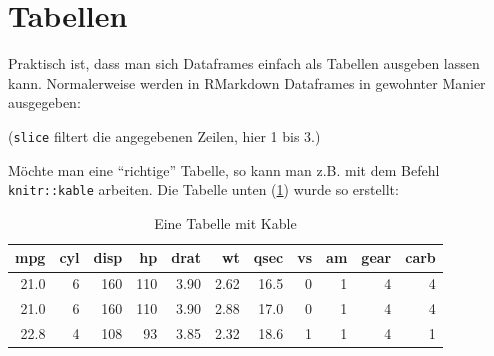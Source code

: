 \documentclass[12pt,]{book}
\newenvironment{Shaded}{\begin{snugshade}}{\end{snugshade}}
\newcommand{\KeywordTok}[1]{\textcolor[rgb]{0.13,0.29,0.53}{\textbf{{#1}}}}
\newcommand{\DataTypeTok}[1]{\textcolor[rgb]{0.13,0.29,0.53}{{#1}}}
\newcommand{\DecValTok}[1]{\textcolor[rgb]{0.00,0.00,0.81}{{#1}}}
\newcommand{\StringTok}[1]{\textcolor[rgb]{0.31,0.60,0.02}{{#1}}}
\newcommand{\CommentTok}[1]{\textcolor[rgb]{0.56,0.35,0.01}{\textit{{#1}}}}
\newcommand{\NormalTok}[1]{{#1}}
\begin{document}
\section{Tabellen}\label{tabellen}

Praktisch ist, dass man sich Dataframes einfach als Tabellen ausgeben
lassen kann. Normalerweise werden in RMarkdown Dataframes in gewohnter
Manier ausgegeben:

\begin{Shaded}
\end{Shaded}

(\texttt{slice} filtert die angegebenen Zeilen, hier 1 bis 3.)

Möchte man eine ``richtige'' Tabelle, so kann man z.B. mit dem Befehl
\texttt{knitr::kable} arbeiten. Die Tabelle unten (\ref{tab:kable})
wurde so erstellt:

\begin{Shaded}
\end{Shaded}

\begin{table}

\caption{\label{tab:kable}Eine Tabelle mit Kable}
\centering
\begin{tabular}[t]{r|r|r|r|r|r|r|r|r|r|r}
\hline
mpg & cyl & disp & hp & drat & wt & qsec & vs & am & gear & carb\\
\hline
21.0 & 6 & 160 & 110 & 3.90 & 2.62 & 16.5 & 0 & 1 & 4 & 4\\
\hline
21.0 & 6 & 160 & 110 & 3.90 & 2.88 & 17.0 & 0 & 1 & 4 & 4\\
\hline
22.8 & 4 & 108 & 93 & 3.85 & 2.32 & 18.6 & 1 & 1 & 4 & 1\\
\hline
\end{tabular}
\end{table}
\end{document}
